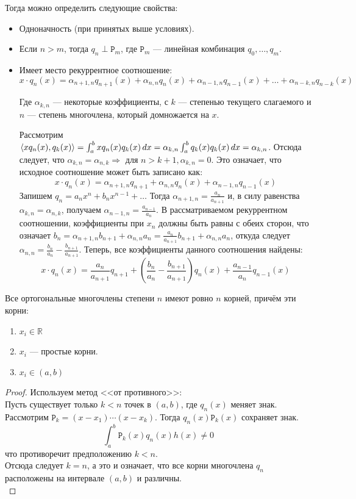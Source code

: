 \documentclass[12pt]{article}
\begin{document}
	Тогда можно определить следующие свойства:
	\begin{itemize}
		\item Одноначность (при принятых выше условиях).
		\item Если $n > m$, тогда $q_n \perp \mathtt{P}_m$, где $\mathtt{P}_m$ --- линейная комбинация $q_0, \dots , q_m$.
		\item Имеет место рекуррентное соотношение: \\
		$$ x \cdot q_n(x) = 
		\alpha_{n+1,n} q_{n+1}(x) + \alpha_{n,n} q_n(x) + \alpha_{n-1, n} q_{n-1} (x) + \ldots + \alpha_{n-k, n} q_{n-k} (x) $$
		
		Где $\alpha_{k, n}$ --- некоторые коэффициенты, с $k$ --- степенью текущего слагаемого и $n$ --- степень многочлена, который 
		домножается	на $x$.
		
		Рассмотрим $\left\langle x q_n(x), q_k(x) \right\rangle = \int_a^b x q_n(x) q_k(x) \,dx
		            = \alpha_{k,n} \int_a^b q_k(x) q_k(x) \,dx = \alpha_{k,n}$.
		Отсюда следует, что $\alpha_{k,n} = \alpha_{n,k} \Rightarrow$ для $n > k+1,\alpha_{k,n} = 0$. 
		Это означает, что исходное соотношение может быть записано как:
		$$ x \cdot q_n(x) = 
		\alpha_{n+1,n} q_{n+1} + \alpha_{n,n} q_n(x) + \alpha_{n-1, n} q_{n-1} (x)$$
		Запишем $q_n = a_n x^n + b_n x^{n-1} + \ldots$
		Тогда $\alpha_{n+1, n} = \frac{a_n}{a_{n+1}}$ и, в силу равенства $\alpha_{k,n} = \alpha_{n,k}$, получаем $\alpha_{n-1, n} 
		= \frac{a_{n-1}}{a_n}$. В рассматриваемом рекуррентном соотношении, коэффициенты при $x_n$ должны быть равны с обеих
		сторон, что означает $b_n = \alpha_{n+1, n} b_{n+1} + \alpha_{n,n} a_n = \frac{a_n}{a_{n+1}} b_{n+1} + \alpha_{n,n} a_n$, 
		откуда следует $\alpha_{n,n} = \frac{b_n}{a_n} - \frac{b_{n+1}}{a_{n+1}}$. Теперь, все коэффициенты данного соотношения
		найдены:
		$$ x \cdot q_n(x) = 
		\frac{a_n}{a_{n+1}} q_{n+1} + (\frac{b_n}{a_n} - \frac{b_{n+1}}{a_{n+1}}) q_n(x) + \frac{a_{n-1}}{a_n} q_{n-1} (x)$$
	\end{itemize}
	
	\begin{state}
		Все ортогональные многочлены степени $n$ имеют ровно $n$ корней, причём эти корни:
		\begin{enumerate}
			\item $x_i \in \mathbb{R}$
			\item $x_i$ --- простые корни.
			\item $x_i \in (a,b)$
		\end{enumerate}
		\begin{proof}
			Используем метод <<от противного>>: \\
			Пусть существует только $k < n$ точек в $(a,b)$, где $q_n(x)$ меняет знак. Рассмотрим 
			$\mathtt{P}_k = (x - x_1) \cdots (x - x_k)$. Тогда $q_n(x) \mathtt{P}_k(x)$ сохраняет знак. 
			$$ \int_a^b \mathtt{P}_k (x) q_n(x) h(x) \neq 0$$
			что противоречит предположению $k < n$. \\
			Отсюда следует $k = n$, а это и означает, что все корни многочлена $q_n$ расположены на интервале $(a,b)$ 
			и различны.\\
		\end{proof}
	\end{state}
\end{document}

